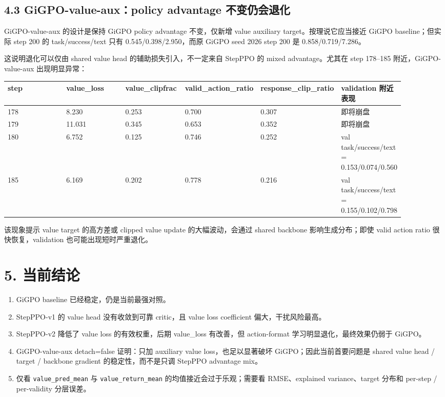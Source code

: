 \documentclass[10pt]{ctexart}
\begin{document}
\subsection*{4.3 GiGPO-value-aux：policy advantage 不变仍会退化}

GiGPO-value-aux 的设计是保持 GiGPO policy advantage 不变，仅新增 value auxiliary target。按理说它应当接近 GiGPO baseline；但实际 step 200 的 task/success/text 只有 0.545/0.398/2.950，而原 GiGPO seed 2026 step 200 是 0.858/0.719/7.286。

这说明退化可以仅由 shared value head 的辅助损失引入，不一定来自 StepPPO 的 mixed advantage。尤其在 step 178--185 附近，GiGPO-value-aux 出现明显异常：

\begin{small}
\begin{longtable}{@{}p{0.15\linewidth}p{0.15\linewidth}p{0.15\linewidth}p{0.15\linewidth}p{0.15\linewidth}p{0.15\linewidth}@{}}
\toprule
step & value\_loss & value\_clipfrac & valid\_action\_ratio & response\_clip\_ratio & validation 附近表现 \\
\midrule
178 & 8.230 & 0.253 & 0.700 & 0.307 & 即将崩盘 \\
179 & 11.031 & 0.345 & 0.653 & 0.352 & 即将崩盘 \\
180 & 6.752 & 0.125 & 0.746 & 0.252 & val task/success/text = 0.153/0.074/0.560 \\
185 & 6.169 & 0.202 & 0.778 & 0.216 & val task/success/text = 0.155/0.102/0.798 \\
\bottomrule
\end{longtable}
\end{small}


该现象提示 value target 的高方差或 clipped value update 的大幅波动，会通过 shared backbone 影响生成分布；即使 valid action ratio 很快恢复，validation 也可能出现短时严重退化。

\section*{5. 当前结论}

\begin{enumerate}
\item GiGPO baseline 已经稳定，仍是当前最强对照。
\item StepPPO-v1 的 value head 没有收敛到可靠 critic，且 value loss coefficient 偏大，干扰风险最高。
\item StepPPO-v2 降低了 value loss 的有效权重，后期 value\_loss 有改善，但 action-format 学习明显退化，最终效果仍弱于 GiGPO。
\item GiGPO-value-aux detach=false 证明：只加 auxiliary value loss，也足以显著破坏 GiGPO；因此当前首要问题是 shared value head / target / backbone gradient 的稳定性，而不是只调 StepPPO advantage mix。
\item 仅看 \texttt{value\_pred\_mean} 与 \texttt{value\_return\_mean} 的均值接近会过于乐观；需要看 RMSE、explained variance、target 分布和 per-step / per-validity 分层误差。
\end{enumerate}
\end{document}
